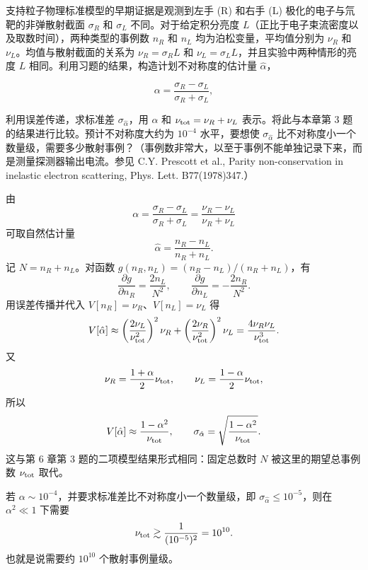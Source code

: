 \begin{question}
支持粒子物理标准模型的早期证据是观测到左手 (R) 和右手 (L)
极化的电子与氘靶的非弹散射截面 \(\sigma_R\) 和 \(\sigma_L\)
不同。对于给定积分亮度
\(L\)（正比于电子束流密度以及取数时间），两种类型的事例数 \(n_R\) 和
\(n_L\) 均为泊松变量，平均值分别为 \(\nu_R\) 和
\(\nu_L\)。均值与散射截面的关系为 \(\nu_R=\sigma_R L\) 和
\(\nu_L=\sigma_L L\)，并且实验中两种情形的亮度 \(L\)
相同。利用习题的结果，构造计划不对称度的估计量 \(\hat\alpha\)，

\[
\alpha=\frac{\sigma_R-\sigma_L}{\sigma_R+\sigma_L},
\]

利用误差传递，求标准差 \(\sigma_{\hat\alpha}\)，用 \(\alpha\) 和
\(\nu_{\rm tot}=\nu_R+\nu_L\) 表示。将此与本章第 3 题
的结果进行比较。预计不对称度大约为 \(10^{-4}\) 水平，要想使
\(\sigma_{\hat\alpha}\)
比不对称度小一个数量级，需要多少散射事例？（事例数非常大，以至于事例不能单独记录下来，而是测量探测器输出电流。参见
C.Y. Prescott et al., Parity non-conservation in inelastic electron
scattering, Phys. Lett. B77(1978)347.）
\begin{solution}
由
\[
\alpha=\frac{\sigma_R-\sigma_L}{\sigma_R+\sigma_L}
=\frac{\nu_R-\nu_L}{\nu_R+\nu_L}
\]
可取自然估计量
\[
\hat\alpha=\frac{n_R-n_L}{n_R+n_L}.
\]
记 \(N=n_R+n_L\)。对函数 \(g(n_R,n_L)=(n_R-n_L)/(n_R+n_L)\)，有
\[
\frac{\partial g}{\partial n_R}=\frac{2n_L}{N^2},
\qquad
\frac{\partial g}{\partial n_L}=-\frac{2n_R}{N^2}.
\]
用误差传播并代入 \(V[n_R]=\nu_R\)、\(V[n_L]=\nu_L\) 得
\[
V[\hat\alpha]\approx
\left(\frac{2\nu_L}{\nu_{\rm tot}^2}\right)^2\nu_R+
\left(\frac{2\nu_R}{\nu_{\rm tot}^2}\right)^2\nu_L
=\frac{4\nu_R\nu_L}{\nu_{\rm tot}^3}.
\]
又
\[
\nu_R=\frac{1+\alpha}{2}\nu_{\rm tot},
\qquad
\nu_L=\frac{1-\alpha}{2}\nu_{\rm tot},
\]
所以
\[
V[\hat\alpha]\approx\frac{1-\alpha^2}{\nu_{\rm tot}},
\qquad
\sigma_{\hat\alpha}=\sqrt{\frac{1-\alpha^2}{\nu_{\rm tot}}}.
\]
这与第 6 章第 3 题的二项模型结果形式相同：固定总数时 \(N\) 被这里的期望总事例数
\(\nu_{\rm tot}\) 取代。

若 \(\alpha\sim10^{-4}\)，并要求标准差比不对称度小一个数量级，即
\(\sigma_{\hat\alpha}\le10^{-5}\)，则在 \(\alpha^2\ll1\) 下需要
\[
\nu_{\rm tot}\gtrsim\frac1{(10^{-5})^2}=10^{10}.
\]
也就是说需要约 \(10^{10}\) 个散射事例量级。
\end{solution}
\end{question}



